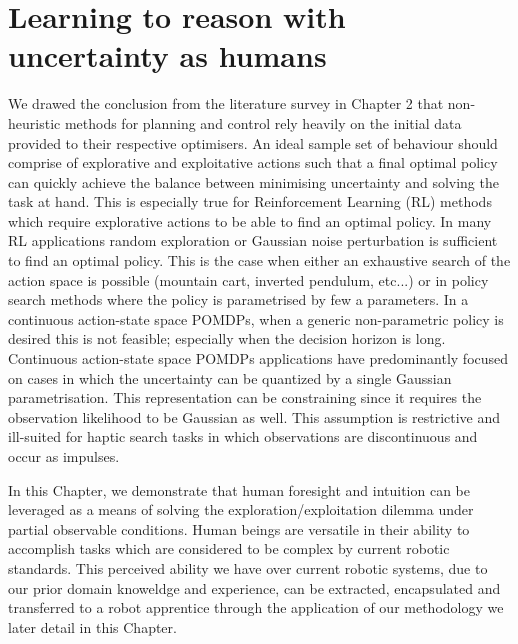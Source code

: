 \chapter{Learning to reason with uncertainty as humans}
%
%
%

We drawed the conclusion from the literature survey in Chapter 2 that non-heuristic methods for planning and control 
rely heavily on the initial data provided to their respective optimisers. An ideal sample set of behaviour should comprise 
of explorative and exploitative actions such that a final optimal policy can quickly achieve the balance between minimising 
uncertainty and solving the task at hand. This is especially true for Reinforcement Learning (RL) methods which require 
explorative actions to be able to find an optimal policy. In many RL applications random exploration or Gaussian noise perturbation
is sufficient to find an optimal policy. This is the case when either an exhaustive search of the action space is possible 
(mountain cart, inverted pendulum, etc...) or in policy search methods where the policy is parametrised by few a parameters.
In a continuous action-state space POMDPs, when a generic non-parametric policy is desired  this is not feasible; especially 
when the decision horizon is long. Continuous action-state space POMDPs applications have predominantly focused on cases in which 
the uncertainty can be quantized by a single Gaussian parametrisation. This representation can be constraining since it requires 
the observation likelihood to be Gaussian as well. This assumption is restrictive and ill-suited for haptic search tasks in 
which observations are discontinuous and occur as impulses. 

In this Chapter, we demonstrate that human foresight and intuition can be leveraged as a means of solving the 
exploration/exploitation dilemma under partial observable conditions. Human beings are versatile in their ability to 
accomplish tasks which are considered to be complex by current robotic standards. This perceived ability we have over 
current robotic systems, due to our prior domain knoweldge and experience, can be extracted, encapsulated and transferred 
to a robot apprentice through the application of our methodology we later detail in this Chapter.

